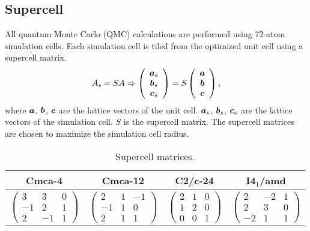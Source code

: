 \subsection{Supercell}
All quantum Monte Carlo (QMC) calculations are performed using 72-atom simulation cells. Each simulation cell is tiled from the optimized unit cell using a supercell matrix.
\begin{align}
A_s = S A \Rightarrow \left(\begin{array}{c}
\boldsymbol{a}_s \\
\boldsymbol{b}_s \\
\boldsymbol{c}_s
\end{array}\right) = S\left(\begin{array}{c}
\boldsymbol{a} \\
\boldsymbol{b} \\
\boldsymbol{c}
\end{array}\right),
\end{align}
where $\boldsymbol{a}$, $\boldsymbol{b}$, $\boldsymbol{c}$ are the lattice vectors of the unit cell. $\boldsymbol{a}_s$, $\boldsymbol{b}_s$, $\boldsymbol{c}_s$ are the lattice vectors of the simulation cell. $S$ is the supercell matrix. The supercell matrices are chosen to maximize the simulation cell radius. %
\begin{table}[h]
\caption{Supercell matrices.}
\begin{tabular}{cccc}
\hline\hline
Cmca-4 & Cmca-12 & C2/c-24 & I4$_1$/amd \\
\hline
$\left(\begin{array}{ccc}
 3 &  3 &  0 \\
-1 &  2 &  1 \\
 2 & -1 &  1
\end{array}\right)$ & $\left(\begin{array}{ccc}
 2 &  1 &  -1 \\
-1 &  1 &  0 \\
 2 &  1 &  1
\end{array}\right)$ & $\left(\begin{array}{ccc}
 2 &  1 &  0 \\
 1 &  2 &  0 \\
 0 &  0 &  1
\end{array}\right)$ & $\left(\begin{array}{ccc}
 2 & -2 &  1 \\
 2 &  3 &  0 \\
-2 &  1 &  1
\end{array}\right)$ \\
\hline\hline
\end{tabular}
\end{table}

